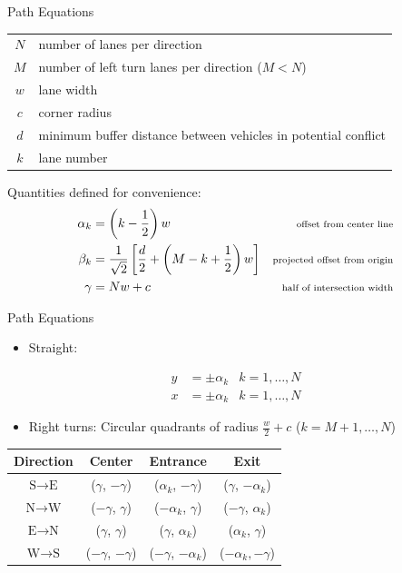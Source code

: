 
\begin{frame}{Path Equations}
\begin{tabular}{c l}
$N$ & number of lanes per direction \\
$M$ & number of left turn lanes per direction ($M < N$) \\
$w$ & lane width \\
$c$ & corner radius \\
$d$ & minimum buffer distance between vehicles in potential conflict \\
$k$ & lane number \\
\end{tabular}

\vspace{\baselineskip}
Quantities defined for convenience:
\begin{align*}
\alpha_k &= \left(k - \frac{1}{2}\right) w
	& \text{\scriptsize offset from center line} \\
\beta_k &= \frac{1}{\sqrt{2}} \left[ \frac{d}{2} +
	\left(M - k + \frac{1}{2}\right) w \right]
	& \text{\scriptsize projected offset from origin} \\
\gamma &= N w + c & \text{\scriptsize half of intersection width}
\end{align*}
\end{frame}


\begin{frame}{Path Equations}
\begin{itemize}
\item Straight:
\end{itemize}
	\begin{align}
	y &= \pm \alpha_k & k = 1,\dots,N \\
	x &= \pm \alpha_k & k = 1,\dots,N
	\end{align}

\begin{itemize}
\item Right turns: Circular quadrants of radius $\frac{w}{2} + c$ ($k = M + 1,\dots,N$)
\end{itemize}
	\begin{center}
	\begin{tabular}{c|c c c}
	Direction & Center & Entrance & Exit \\
	\hline
	$\text{S} \to \text{E}$ & ($\gamma$, $-\gamma$) & ($\alpha_k$, $-\gamma$) & ($\gamma$, $-\alpha_k$) \\
	$\text{N} \to \text{W}$ & ($-\gamma$, $\gamma$) & ($-\alpha_k$, $\gamma$) & ($-\gamma$, $\alpha_k$) \\
	$\text{E} \to \text{N}$ & ($\gamma$, $\gamma$) & ($\gamma$, $\alpha_k$) & ($\alpha_k$, $\gamma$) \\
	$\text{W} \to \text{S}$ & ($-\gamma$, $-\gamma$) & ($-\gamma$, $-\alpha_k$) & ($-\alpha_k, -\gamma$) \\
	\end{tabular}
	\end{center}

\end{frame}

